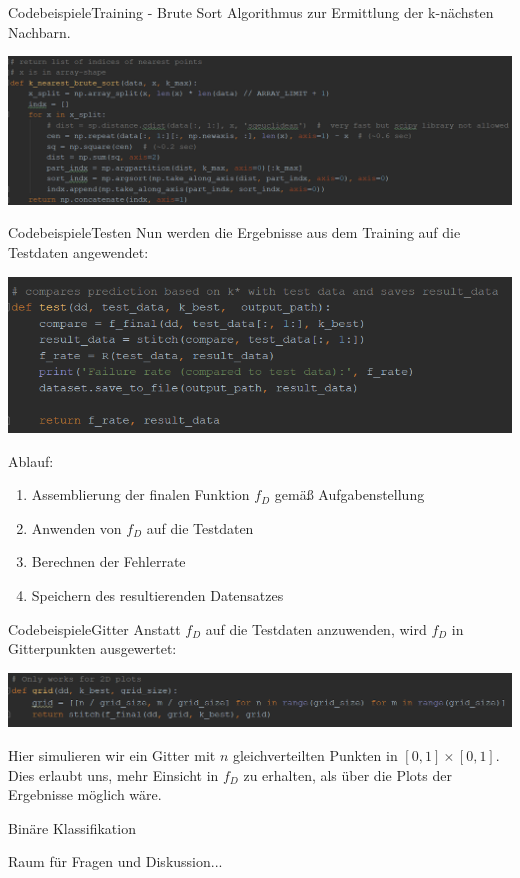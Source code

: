 \documentclass[9pt]{beamer}
\begin{document}
\begin{frame}{Codebeispiele}{Training - Brute Sort}
Algorithmus zur Ermittlung der k-nächsten Nachbarn.
\begin{center}
\includegraphics[scale=0.52]{assets/train_brute_sort_impl.png}
\end{center}
\end{frame}

\begin{frame}{Codebeispiele}{Testen}
Nun werden die Ergebnisse aus dem Training auf die Testdaten angewendet:
\begin{center}
\includegraphics[scale=0.75]{assets/test.png}
\end{center}
Ablauf:
\begin{enumerate}[1.]
\item{Assemblierung der finalen Funktion $f_D$ gemäß Aufgabenstellung}
\item{Anwenden von $f_D$ auf die Testdaten}
\item{Berechnen der Fehlerrate}
\item{Speichern des resultierenden Datensatzes}
\end{enumerate}
\end{frame}

\begin{frame}{Codebeispiele}{Gitter}
Anstatt $f_D$ auf die Testdaten anzuwenden, wird $f_D$ in Gitterpunkten ausgewertet: 
\begin{center}
\includegraphics[scale=0.5]{assets/grid.png}
\end{center}
Hier simulieren wir ein Gitter mit $n$ gleichverteilten Punkten in $[0, 1] \times [0, 1]$.\\[0.4em]
Dies erlaubt uns, mehr Einsicht in $f_D$ zu erhalten, als über die Plots der Ergebnisse möglich wäre.
\end{frame}

\begin{frame}{Binäre Klassifikation}
\begin{huge}
Raum für Fragen und Diskussion...
\end{huge}
\end{frame}
\end{document}
